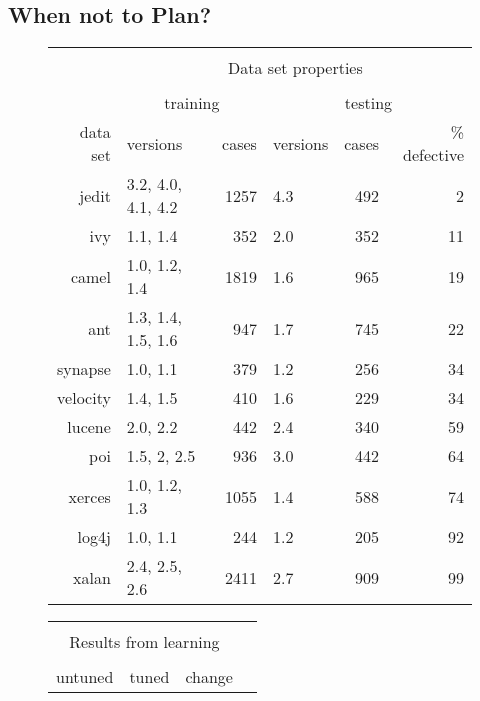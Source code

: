 \documentclass{sig-alternate}
\begin{document}
\subsection{When not to Plan?}
\begin{figure*}[!t]
	\scriptsize
	\begin{center}
		\begin{minipage}{.46\linewidth}
			\begin{tabular}{r@{~}|l@{~}|r@{~}|l@{~}|r@{~}|r@{~}|} \cline{2-6}
				& \multicolumn{5}{c|}{ }\\ 
				
				& \multicolumn{5}{c|}{ Data set  properties}\\ 
				& \multicolumn{5}{c|}{  }\\ 
				& \multicolumn{2}{c|}{training}   & \multicolumn{3}{c|}{testing}      \\ \cline{2-6}
				data set      & versions           & cases & versions     & cases    & \% defective             \\ \hline
				jedit    & 3.2, 4.0, 4.1, 4.2 & 1257      & 4.3          & 492          & 2 \\
				ivy      & 1.1, 1.4           & 352       & 2.0          & 352          & 11 \\
				camel    & 1.0, 1.2, 1.4      & 1819      & 1.6          & 965          & 19 \\
				ant      & 1.3, 1.4, 1.5, 1.6 & 947       & 1.7          & 745          & 22 \\
				synapse  & 1.0, 1.1           & 379       & 1.2          & 256          & 34 \\
				velocity & 1.4, 1.5           & 410       & 1.6          & 229          & 34 \\
				lucene   & 2.0, 2.2           & 442       & 2.4          & 340          & 59 \\
				poi      & 1.5, 2, 2.5        & 936       & 3.0          & 442          & 64 \\
				xerces   & 1.0, 1.2, 1.3      & 1055      & 1.4          & 588          & 74  \\ 
				log4j    & 1.0, 1.1           & 244       & 1.2          & 205          & 92   \\
				xalan    & 2.4, 2.5, 2.6      & 2411      & 2.7          & 909          & 99  \\\hline 
				
				
			\end{tabular}\end{minipage}\begin{minipage}{.4\linewidth}
			\begin{tabular}{|rrr|rrr|rr|l} \cline{1-8}
				\multicolumn{8}{|c|}{  }\\
				\multicolumn{8}{|c|}{  Results from learning}\\
				\multicolumn{8}{|c|}{   }\\
				\multicolumn{3}{|c|}{untuned} & \multicolumn{3}{c|}{tuned} & \multicolumn{2}{c|}{change}\\
				\cline{1-8}
				

\end{tabular}
\end{minipage}
\end{center}
\end{figure*}
\end{document}
